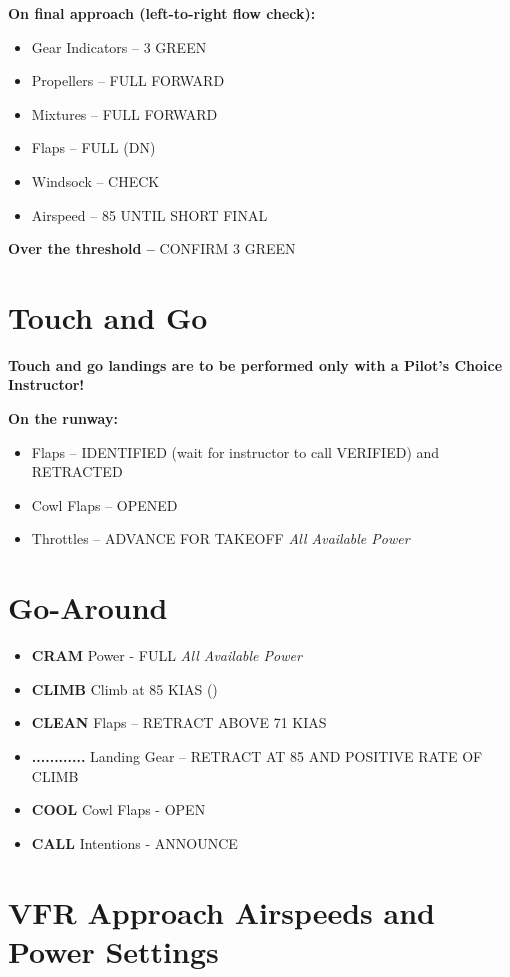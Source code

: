 {\textbf{On final approach (left-to-right flow check):}
\begin{itemize}[label={}]
\item Gear Indicators – 3 GREEN
\item Propellers – FULL FORWARD
\item Mixtures – FULL FORWARD
\item Flaps – FULL (DN)
\item Windsock – CHECK
\item Airspeed – 85 UNTIL SHORT FINAL
\end{itemize}

\textbf{Over the threshold –} CONFIRM 3 GREEN

\section{Touch and Go}

\textbf{Touch and go landings are to be performed only with a Pilot’s Choice Instructor!}

\textbf{On the runway:}
\begin{itemize}[label={}]
\item Flaps – IDENTIFIED (wait for instructor to call VERIFIED) and RETRACTED
\item Cowl Flaps – OPENED
\item Throttles – ADVANCE FOR TAKEOFF \emph{All Available Power}
\end{itemize}

\section{Go-Around}


\begin{itemize}[label={}]
\item \textbf{CRAM} Power - FULL \emph{All Available Power}
\item \textbf{CLIMB} Climb at 85 KIAS (\vyse)
\item \textbf{CLEAN} Flaps – RETRACT ABOVE 71 KIAS
\item \textbf{............} Landing Gear – RETRACT AT 85 AND POSITIVE RATE OF CLIMB
\item \textbf{COOL} Cowl Flaps - OPEN
\item \textbf{CALL} Intentions - ANNOUNCE
\end{itemize}

\newpage

\section{VFR Approach Airspeeds and Power Settings}

}
